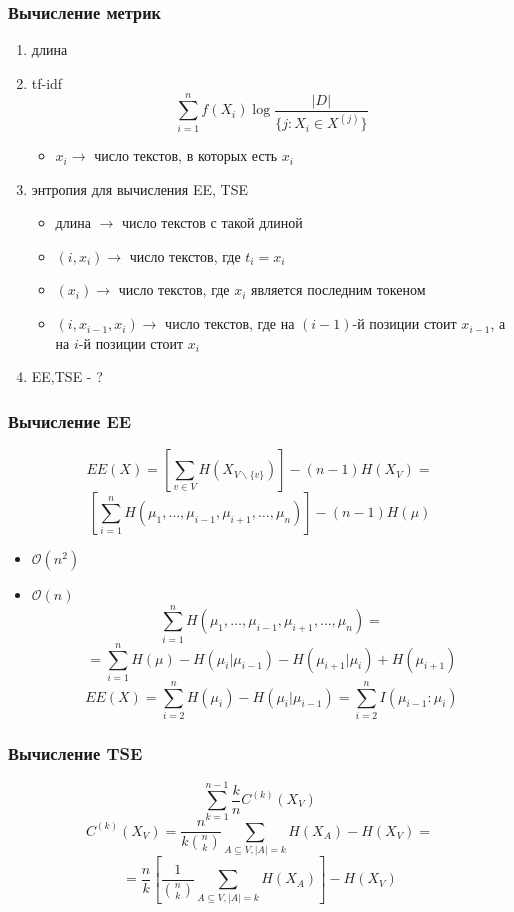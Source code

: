 \documentclass{beamer}
\begin{document}
\begin{frame}
	\frametitle{Вычисление метрик}
	\begin{enumerate}
		\item длина
		\item tf-idf
			\[\sum\limits_{i=1}^{n}f(X_i)\log\frac{|D|}{\{j:X_i\in X^{(j)}\}}\]
			\begin{itemize}
				\item $x_i \rightarrow$ число текстов, в которых есть $x_i$
			\end{itemize}
		\item энтропия для вычисления EE, TSE
			\begin{itemize}
				\item длина $\rightarrow$ число текстов с такой длиной
				\item $(i, x_i) \rightarrow$ число текстов, где $t_i = x_i$ 
				\item $(x_i)\rightarrow$ число текстов, где $x_i$ является последним токеном
				\item $(i, x_{i-1}, x_i) \rightarrow$ число текстов, где на $(i-1)$-й позиции стоит $x_{i-1}$, а на $i$-й позиции стоит $x_i$
			\end{itemize}
		\item EE,TSE - ?
	\end{enumerate}
\end{frame}

\begin{frame}
	\frametitle{Вычисление EE}
	\[
		EE(X) = \left[\sum\limits_{v\in V}H(X_{V\backslash\{v\}})\right] - (n - 1)H(X_V) = 
	\]
	\[
		\left[\sum\limits_{i=1}^{n}H(\mu_1,\ldots,\mu_{i-1},\mu_{i+1},\ldots,\mu_n)\right] - (n - 1)H(\mu)
	\]
	\begin{itemize}
		\item $\mathcal{O}(n^2)$
		\item $\mathcal{O}(n)$
			\[
				\sum\limits_{i=1}^{n}H(\mu_1,\ldots,\mu_{i-1},\mu_{i+1},\ldots,\mu_n) =\]
			\[ = \sum\limits_{i=1}^{n}H(\mu) - H(\mu_i|\mu_{i-1}) - H(\mu_{i+1}|\mu_i) + H(\mu_{i+1})\]
			\[
				EE(X) = \sum\limits_{i=2}^{n}H(\mu_i) - H(\mu_i|\mu_{i-1})= \sum\limits_{i=2}^{n}I(\mu_{i-1}\colon\mu_i)
			\]
	\end{itemize}
\end{frame}

\begin{frame}
	\frametitle{Вычисление TSE}
	\[
		\sum\limits_{k=1}^{n-1}\frac{k}{n}C^{(k)}(X_V)
	\]
	\[
	 	C^{(k)}(X_V) = \frac{n}{k\binom{n}{k}}\sum\limits_{A\subseteq V,|A|=k}H(X_A) - H(X_V) =
 	\]
 	\[
 		= \frac{n}{k}\left[\frac{1}{\binom{n}{k}}\sum\limits_{A\subseteq V,|A|=k}H(X_A)\right] - H(X_V)
	\]
\end{frame}
\end{document}
